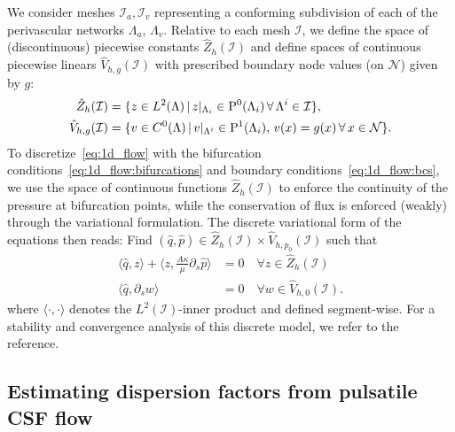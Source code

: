 We consider meshes $\mathcal{I}_a, \mathcal{I}_v$ representing a
conforming subdivision of each of the perivascular networks
$\Lambda_a$, $\Lambda_v$. Relative to each mesh $\mathcal{I}$, we define the
space of (discontinuous) piecewise constants $\hat{Z}_h(\mathcal{I})$ and define
spaces of continuous piecewise linears $\hat{V}_{h, g}(\mathcal{I})$ with
prescribed boundary node values (on $\mathcal{N}$) given by $g$:
\begin{align}
  \hat{Z}_h(\mathcal{I}) &= \{z \in L^2(\Lambda) \, | \, z \vert_{\Lambda_i} \in \mathrm{P}^{0}(\Lambda_i) \, \forall \, \Lambda^i \in \mathcal{I}\}, \\
  \hat{V}_{h, g}(\mathcal{I}) &= \{ v \in C^0(\Lambda) \, | \, v \vert_{\Lambda^i} \in \mathrm{P}^1(\Lambda_i), \, v(x) = g(x) \, \forall \, x \in \mathcal{N} \} .
\end{align}
To discretize~\eqref{eq:1d_flow} with the bifurcation
conditions~\eqref{eq:1d_flow:bifurcations} and boundary
conditions~\eqref{eq:1d_flow:bcs}, we use the space of continuous
functions $\hat{Z}_h(\mathcal{I})$ to enforce the continuity of the pressure at
bifurcation points, while the conservation of flux is enforced
(weakly) through the variational formulation. The discrete variational form of the equations then reads: Find $(\hat{q}, \hat{p}) \in \hat{Z}_h(\mathcal{I}) \times \hat{V}_{h, p_0}(\mathcal{I})$ such that
\begin{subequations}
\begin{align}
  \langle \hat{q}, z \rangle +  \langle z, \frac{A \kappa}{\mu} \partial_s \hat{p}  \rangle &= 0 \quad \forall z \in \hat{Z}_h(\mathcal{I}) \\
  \langle \hat{q}, \partial_s w \rangle &= 0 \quad  \forall w \in \hat{V}_{h, 0}(\mathcal{I}).
\end{align}
\end{subequations}%
where $\langle \cdot, \cdot \rangle$ denotes the $L^2(\mathcal{I})$-inner product and defined segment-wise. For a stability and convergence analysis of this discrete model, we refer to the reference\cite{gjerde2024directional}. 

\subsection{Estimating dispersion factors from pulsatile CSF flow}
\label{sec:app:dispersion}

